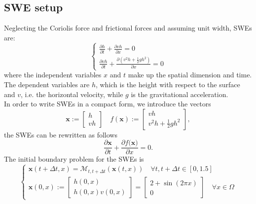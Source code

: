 \documentclass[smallcondensed]{svjour3}
\begin{document}
\subsection{SWE setup}
Neglecting the Coriolis force and frictional forces and assuming unit width, SWEs are:
\begin{equation}\label{SWEsetup}
\left \{
\begin{array}{ll}
\frac{\partial h}{\partial t}+\frac{\partial vh}{\partial {x}}=0\\
\frac{\partial vh}{\partial t}+\frac{\partial (v^{2}h+\frac{1}{2}gh^{2})}{\partial {x}}=0
\end{array}
\right . 
\end{equation}
where the independent variables ${x}$ and $t$ make up the spatial dimension and time. The dependent
variables are $h$, which is the height with respect to the surface and $v$, i.e. 
the horizontal velocity, while $g$ is the gravitational acceleration.\\
In order to write  SWEs in a compact form, we introduce the vectors
\begin{equation}
\textbf{x}:=\left[\begin{array}{ll}
h\\
vh
\end{array}\right]\quad 
f(\textbf{x}):=\left[\begin{array}{ll}
vh\\
v^{2}h+\frac{1}{2}gh^{2}
\end{array}\right],
\end{equation}
the SWEs can be rewritten as follows
\begin{equation}\label{80}
\frac{\partial \textbf{x}}{\partial t}+\frac{\partial f(\textbf{x)}}{\partial {x}}=0.
\end{equation}
The initial boundary problem for the SWEs is 
\begin{equation}
\left\{\begin{array}{lllll}
\textbf{x}(t+\Delta t,x)=\mathcal{M}_{t,t+\Delta t}(\textbf{x}(t,x)) \quad \forall t, t+\Delta t \in [0,1.5]\\
\textbf{x}(0,x):=\left[\begin{array}{ll}h(0,x)\\
h(0,x)v(0,x)
\end{array}\right] =\left[\begin{array}{ll} 2+\sin(2\pi x)\\
0 \end{array} \right] \quad \forall x \in \Omega \end{array}\right.
\end{equation}
\end{document}
